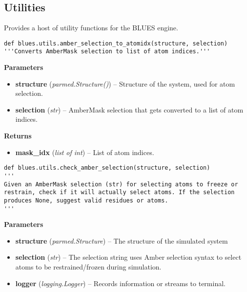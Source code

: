 \hypertarget{utilities}{%
\subsection{Utilities}\label{utilities}}

Provides a host of utility functions for the BLUES engine.

\begin{description}
\begin{verbatim}
def blues.utils.amber_selection_to_atomidx(structure, selection)
'''Converts AmberMask selection to list of atom indices.'''
\end{verbatim}

\begin{description}
\item
    \textbf{Parameters}
\begin{itemize}
\item
  \textbf{structure} (\emph{parmed.Structure()}) -- Structure of the
  system, used for atom selection.
\item
  \textbf{selection} (\emph{str}) -- AmberMask selection that gets
  converted to a list of atom indices.
\end{itemize}
\item
    \textbf{Returns}
\begin{itemize}
    \item
        \textbf{mask\_idx} (\emph{list of int}) -- List of atom indices.
\end{itemize}
\end{description}
\end{description}

\begin{description}
\begin{verbatim}
def blues.utils.check_amber_selection(structure, selection)
'''
Given an AmberMask selection (str) for selecting atoms to freeze or
restrain, check if it will actually select atoms. If the selection
produces None, suggest valid residues or atoms.
'''
\end{verbatim}


\begin{description}
\item
    \textbf{Parameters}
\begin{itemize}
\item
  \textbf{structure} (\emph{parmed.Structure}) -- The structure of the
  simulated system
\item
  \textbf{selection} (\emph{str}) -- The selection string uses Amber
  selection syntax to select atoms to be restrained/frozen during
  simulation.
\item
  \textbf{logger} (\emph{logging.Logger}) -- Records information or
  streams to terminal.
\end{itemize}
\end{description}
\end{description}

